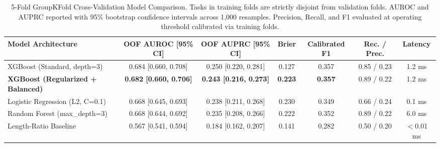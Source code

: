 \begin{table}[t]
\centering
\small
\caption{5-Fold GroupKFold Cross-Validation Model Comparison. Tasks in training folds are strictly disjoint from validation folds. AUROC and AUPRC reported with 95\% bootstrap confidence intervals across 1,000 resamples. Precision, Recall, and F1 evaluated at operating threshold calibrated via training folds.}
\label{tab:model_comparison}
\begin{tabular}{lcccccc}
\toprule
\textbf{Model Architecture} & \textbf{OOF AUROC [95\% CI]} & \textbf{OOF AUPRC [95\% CI]} & \textbf{Brier} & \textbf{Calibrated F1} & \textbf{Rec. / Prec.} & \textbf{Latency} \\
\midrule
XGBoost (Standard, depth=3) & 0.684 [0.660, 0.708] & 0.250 [0.220, 0.281] & 0.127 & 0.357 & 0.85 / 0.23 & 1.2 ms \\
\textbf{XGBoost (Regularized + Balanced)} & \textbf{0.682 [0.660, 0.706]} & \textbf{0.243 [0.216, 0.273]} & \textbf{0.223} & \textbf{0.357} & 0.89 / 0.22 & 1.2 ms \\
Logistic Regression (L2, C=0.1) & 0.668 [0.645, 0.693] & 0.238 [0.211, 0.268] & 0.230 & 0.349 & 0.66 / 0.24 & 0.1 ms \\
Random Forest (max_depth=3) & 0.668 [0.644, 0.692] & 0.235 [0.208, 0.266] & 0.222 & 0.352 & 0.89 / 0.22 & 6.0 ms \\
\midrule
Length-Ratio Baseline & 0.567 [0.541, 0.594] & 0.184 [0.162, 0.207] & 0.141 & 0.282 & 0.50 / 0.20 & $<$0.01 ms \\
\bottomrule
\end{tabular}
\end{table}